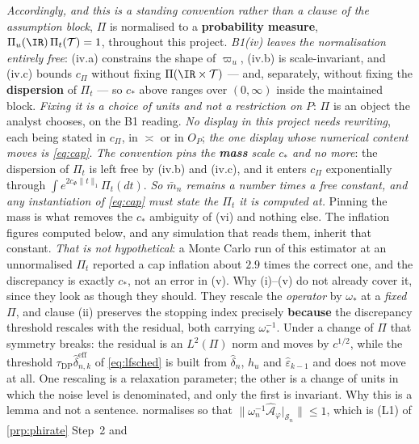 \begin{lemma}
\emph{Accordingly, and this is a standing convention rather than a clause of the assumption block},
$\Pi$ is normalised to a \textbf{probability measure}, $\Pi_u(\IR)\,\Pi_t(\mathcal T)=1$, throughout this
project. \emph{B1(iv) leaves the normalisation entirely free}: (iv.a) constrains the shape of $\varpi_u$,
(iv.b) is scale-invariant, and (iv.c) bounds $c_\Pi$ without fixing $\Pi(\IR\times\mathcal T)$ --- and,
separately, without fixing the \textbf{dispersion} of $\Pi_t$ --- so
$c_\ast$
above ranges over $(0,\infty)$ inside the maintained block. \emph{Fixing it is a choice of units and not a
restriction on $P$}: $\Pi$ is an object the analyst chooses, on the B1 reading. \emph{No display in this
project needs rewriting}, each being stated in $c_\Pi$, in $\asymp$ or in $O_P$; \emph{the one display
whose numerical content moves is \eqref{eq:cap}}. \emph{The convention pins the \textbf{mass} scale
$c_\ast$ and no more}: the dispersion of $\Pi_t$ is left free by \textup{(iv.b)} and \textup{(iv.c)},
and it enters $c_\Pi$ exponentially through $\int e^{2c_\Phi\|t\|_1}\Pi_t(dt)$. \emph{So $\bar m_n$
remains a number times a free constant, and any instantiation of \eqref{eq:cap} must state the $\Pi_t$
it is computed at.} Pinning the mass is what removes the $c_\ast$ ambiguity of \textup{(vi)} and
nothing else. The inflation figures computed below, and any
simulation that reads them, inherit that constant. \emph{That is not hypothetical}: a Monte Carlo run
of this estimator at an unnormalised $\Pi_t$ reported a cap inflation about $2.9$ times the correct one,
and the discrepancy is exactly $c_\ast$, not an error in \textup{(v)}.
Why \textup{(i)}--\textup{(v)} do not already cover it, since they look as though they should. They
rescale the \emph{operator} by $\omega_\ast$ at a \emph{fixed} $\Pi$, and clause (ii) preserves the
stopping index precisely \textbf{because} the discrepancy threshold rescales with the residual, both
carrying $\omega_\ast^{-1}$. Under a change of $\Pi$ that symmetry breaks: the residual is an $L^{2}(\Pi)$
norm and moves by $c^{1/2}$, while the threshold $\tau_{\mathrm{DP}}\hat\delta^{\mathrm{eff}}_{n,k}$ of
\eqref{eq:lfsched} is built from $\hat\delta_n$, $h_u$ and $\hat\varepsilon_{k-1}$ and does not move at
all. One rescaling is a relaxation parameter; the other is a change of units in which the noise
level is denominated, and only the first is invariant.
Why this is a lemma and not a sentence.  normalises so that
$\|\omega_n^{-1}\hat{\mathcal A}_\varphi\vert_{\mathcal S_n}\|\le1$, which is (L1) of
\cref{prp:phirate} Step~2 and

\end{lemma}
